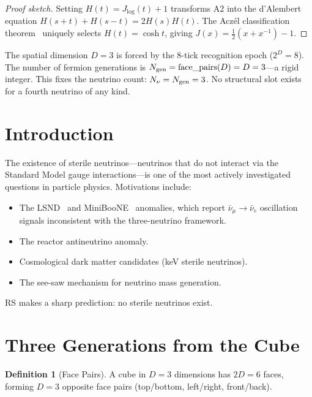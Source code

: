 \documentclass[12pt,a4paper]{article}
\theoremstyle{definition}
\newtheorem{definition}[theorem]{Definition}
\theoremstyle{remark}
\begin{document}
\begin{proof}[Proof sketch]
Setting $H(t)=J_{\log}(t)+1$ transforms A2 into the d'Alembert
equation $H(s+t)+H(s-t)=2H(s)H(t)$.  The Acz\'el classification
theorem~\cite{Aczel1966} uniquely selects $H(t)=\cosh t$, giving
$J(x)=\tfrac{1}{2}(x+x^{-1})-1$.
\end{proof}

\noindent The spatial dimension $D=3$ is forced by the 8-tick
recognition epoch ($2^D=8$).  The number of fermion generations
is $N_{\rm gen}=\mathrm{face\_pairs}(D)=D=3$---a rigid integer.
This fixes the neutrino count: $N_\nu = N_{\rm gen} = 3$.  No
structural slot exists for a fourth neutrino of any kind.

\section{Introduction}
\label{sec:intro}

The existence of sterile neutrinos---neutrinos that do not interact
via the Standard Model gauge interactions---is one of the most
actively investigated questions in particle physics.  Motivations
include:
\begin{itemize}
  \item The LSND~\cite{LSND2001} and MiniBooNE~\cite{MiniBooNE2018}
  anomalies, which report $\bar{\nu}_\mu \to \bar{\nu}_e$
  oscillation signals inconsistent with the three-neutrino framework.
  \item The reactor antineutrino anomaly.
  \item Cosmological dark matter candidates (keV sterile neutrinos).
  \item The see-saw mechanism for neutrino mass generation.
\end{itemize}

RS makes a sharp prediction: no sterile neutrinos exist.

\section{Three Generations from the Cube}
\label{sec:three-gen}

\begin{definition}[Face Pairs]
A cube in $D = 3$ dimensions has $2D = 6$ faces, forming $D = 3$
opposite face pairs (top/bottom, left/right, front/back).
\end{definition}
\end{document}
